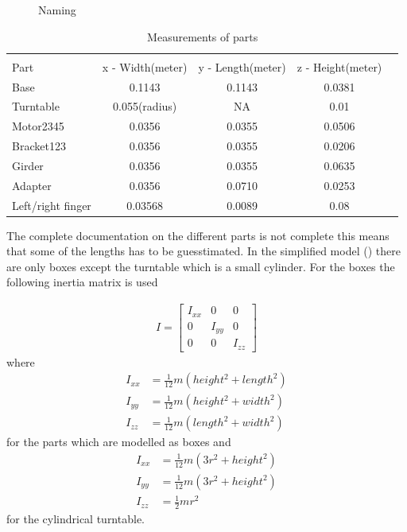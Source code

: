 \begin{figure}[htbp]
  \centering
  
  \caption{Naming}
  \label{fig:naming}
\end{figure}

\begin{table}[h]
\centering
\caption{Measurements of parts}
\label{table:measurements}
    \begin{tabular}{l c c c r}
        \hline \\[-1em]
        Part  &  x - Width(meter) & y - Length(meter) & z - Height(meter)\\
        \hline
        Base & 0.1143 & 0.1143 & 0.0381\\
        Turntable & 0.055(radius) & NA & 0.01\\
        Motor2345 & 0.0356 & 0.0355 & 0.0506 \\
        Bracket123 & 0.0356 & 0.0355 & 0.0206 \\
        Girder & 0.0356 & 0.0355 & 0.0635\\
        Adapter & 0.0356 & 0.0710 & 0.0253\\
        Left/right finger & 0.03568 & 0.0089 & 0.08\\
        \hline
    \end{tabular}
\end{table}


The complete documentation on the different parts is not complete this means that some of the lengths has to be guesstimated. In the simplified model () there are only boxes except the turntable which is a small cylinder. For the boxes the following inertia matrix is used

\begin{align*}
    I = 
    \begin{bmatrix}
        I_{xx} & 0 & 0\\
        0 & I_{yy} & 0\\
        0 & 0 & I_{zz}
    \end{bmatrix}
\end{align*}
where
\begin{align*}
    I_{xx} &= \frac{1}{12}m(height^2+length^2)\\
    I_{yy} &= \frac{1}{12}m(height^2+width^2)\\
    I_{zz} &= \frac{1}{12}m(length^2+width^2)
\end{align*}
for the parts which are modelled as boxes and 
\begin{align*}
    I_{xx} &= \frac{1}{12}m(3r^2+height^2)\\
    I_{yy} &= \frac{1}{12}m(3r^2+height^2)\\
    I_{zz} &= \frac{1}{2}mr^2
\end{align*}
for the cylindrical turntable. 

